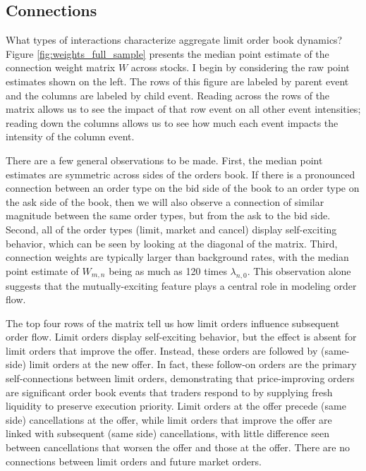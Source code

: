 	\subsection{Connections}
		What types of interactions characterize aggregate limit order book dynamics? Figure \ref{fig:weights_full_sample} presents the median point estimate of the connection weight matrix $W$ across stocks. I begin by considering the raw point estimates shown on the left. The rows of this figure are labeled by parent event and the columns are labeled by child event. Reading across the rows of the matrix allows us to see the impact of that row event on all other event intensities; reading down the columns allows us to see how much each event impacts the intensity of the column event.

		There are a few general observations to be made. First, the median point estimates are symmetric across sides of the orders book. If there is a pronounced connection between an order type on the bid side of the book to an order type on the ask side of the book, then we will also observe a connection of similar magnitude between the same order types, but from the ask to the bid side. Second, all of the order types (limit, market and cancel) display self-exciting behavior, which can be seen by looking at the diagonal of the matrix. Third, connection weights are typically larger than background rates, with the median point estimate of $W_{m,n}$ being as much as 120 times $\lambda_{n,0}$. This observation alone suggests that the mutually-exciting feature plays a central role in modeling order flow.

		The top four rows of the matrix tell us how limit orders influence subsequent order flow. Limit orders display self-exciting behavior, but the effect is absent for limit orders that improve the offer. Instead, these orders are followed by (same-side) limit orders at the new offer. In fact, these follow-on orders are the primary self-connections between limit orders, demonstrating that price-improving orders are significant order book events that traders respond to by supplying fresh liquidity to preserve execution priority. Limit orders at the offer precede (same side) cancellations at the offer, while limit orders that improve the offer are linked with subsequent (same side) cancellations, with little difference seen between cancellations that worsen the offer and those at the offer. There are no connections between limit orders and future market orders.

